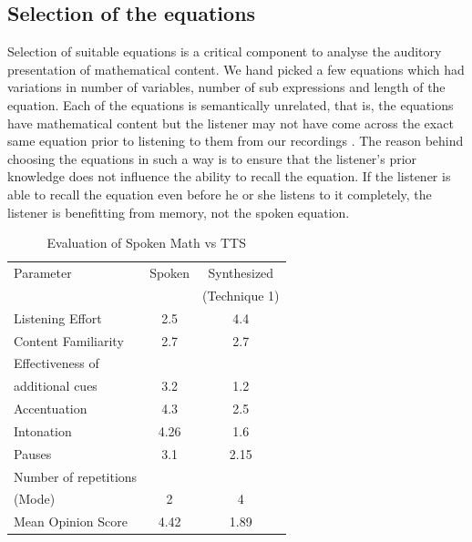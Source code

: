 \documentclass{article}
\begin{document}
\subsection{Selection of the equations}
\label{ssec:equations}

Selection  of suitable equations is a critical component to analyse the auditory presentation of mathematical content. We hand picked a few equations which had variations in number of variables, number of sub expressions and length of the equation. Each of the equations is semantically unrelated, that is, the equations have mathematical content but the listener may not have come across the exact same equation prior to listening to them from our recordings . The reason behind choosing the equations in such a way is to ensure that the listener's prior knowledge does not influence the ability to recall the equation. If the listener is able to recall the equation even before he or she listens to it completely, the listener is benefitting from memory, not the spoken equation.


\begin{table}[t]
\caption{\label{tts}Evaluation of Spoken Math vs TTS}

\vspace{8pt} %

\centering
\begin{tabular}{|l |c |c|}
\hline%
Parameter & Spoken & Synthesized  \\
                  &              & (Technique 1) \\[0.5ex]
\hline

Listening Effort & 2.5 & 4.4 \\
\hline
Content Familiarity &2.7 &2.7 \\
\hline
Effectiveness of & & \\
additional cues &3.2 &1.2 \\
\hline
Accentuation &4.3 &2.5 \\
\hline
Intonation & 4.26 & 1.6  \\
\hline
Pauses & 3.1 & 2.15 \\
\hline
Number of repetitions & & \\
(Mode) &2 & 4 \\
\hline
Mean Opinion Score & 4.42 & 1.89  \\%
\hline



\end{tabular}
\end{table}
\end{document}
